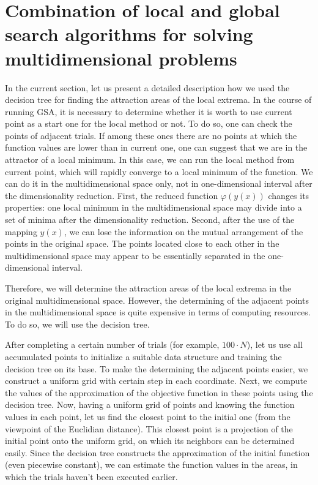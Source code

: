 \documentclass{cmi}
\begin{document}
\section{Combination of local and global search algorithms for solving multidimensional  problems}\label{SecGSAL}

In the current section, let us present a detailed description how we used the decision tree for finding  the attraction areas of the local extrema.  In the course of running GSA, it is necessary to determine whether it is worth to use current point as a  start one for the local method or not. To do so, one can check the points of adjacent trials. If among  these ones there are no points at which the function values are lower than in current one, one  can suggest that we are in the attractor of a local minimum. In this case, we can run the local method  from current point, which will rapidly converge to a local minimum of the function.  We can do it in the multidimensional space only, not in one-dimensional interval after the  dimensionality reduction.  First, the reduced function $\varphi(y(x))$ changes its properties: one local minimum in the  multidimensional space may divide into a set of minima after the dimensionality reduction.  Second, after the use of the mapping $y(x)$, we can lose the information on the mutual arrangement of  the points in the original space. The points located close to each other in the multidimensional space  may appear to be essentially separated in the one-dimensional interval.




Therefore, we will determine the attraction areas of the local extrema in the original multidimensional space. However, the determining of the adjacent points in the multidimensional space is quite expensive in terms of computing resources. To do so, we will use the decision tree. 

After completing a certain number of trials (for example, $100\cdot N$), let us use all accumulated  points to initialize a suitable data structure and training the decision tree on its base. To make the  determining the adjacent points easier, we construct a uniform grid with certain step in each coordinate.  Next, we compute the values of the approximation of the objective function in these points  using the decision tree. Now, having a uniform grid of points and knowing the function values in each  point, let us find the closest point to the initial one (from the viewpoint of the Euclidian distance). This  closest point is a projection of the initial point onto the uniform grid, on which its neighbors can be  determined easily. Since the decision tree constructs the approximation of the initial function (even  piecewise constant), we can estimate the function values in the areas, in which the trials haven't been  executed earlier.
\end{document}
